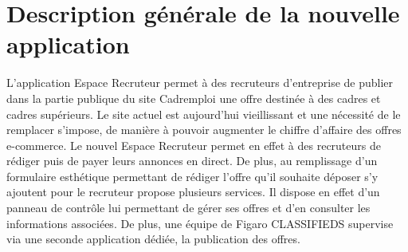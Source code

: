 \section{Description générale de la nouvelle application}
\label{sec:Description generale de l'application}
L'application Espace Recruteur permet à des recruteurs d'entreprise de publier dans la partie publique du site Cadremploi une offre destinée à des cadres et cadres supérieurs.
Le site actuel est aujourd'hui vieillissant et une nécessité de le remplacer s'impose, de manière à pouvoir augmenter le chiffre d'affaire des offres e-commerce.
Le nouvel Espace Recruteur permet en effet à des recruteurs de rédiger puis de payer leurs annonces en direct.
De plus, au remplissage d'un formulaire esthétique permettant de rédiger l'offre qu'il souhaite déposer s'y ajoutent pour le recruteur propose plusieurs services.
Il dispose en effet d'un panneau de contrôle lui permettant de gérer ses offres et d'en consulter les informations associées.
De plus, une équipe de Figaro CLASSIFIEDS supervise via une seconde application dédiée, la publication des offres.


